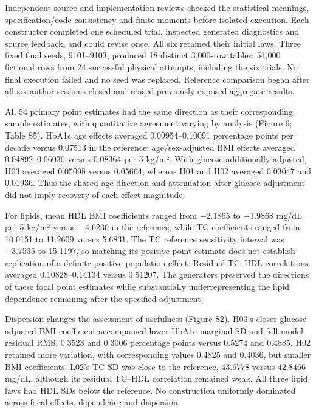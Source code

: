 \documentclass[11pt,letterpaper]{article}
\begin{document}
Independent source and implementation reviews checked the statistical meanings, specification/\allowbreak{}code consistency and finite moments before isolated execution. Each constructor completed one scheduled trial, inspected generated diagnostics and source feedback, and could revise once. All six retained their initial laws. Three fixed final seeds, 9101–\allowbreak{}9103, produced 18 distinct 3,000-row tables: 54,000 fictional rows from 24 successful physical attempts, including the six trials. No final execution failed and no seed was replaced. Reference comparison began after all six author sessions closed and reused previously exposed aggregate results.


All 54 primary point estimates had the same direction as their corresponding sample estimates, with quantitative agreement varying by analysis (Figure 6; Table S5). HbA1c age effects averaged 0.09954–\allowbreak{}0.10091 percentage points per decade versus 0.07513 in the reference; age/\allowbreak{}sex-adjusted BMI effects averaged 0.04892–\allowbreak{}0.06030 versus 0.08364 per 5 kg/\allowbreak{}m². With glucose additionally adjusted, H03 averaged 0.05098 versus 0.05664, whereas H01 and H02 averaged 0.03047 and 0.01936. Thus the shared age direction and attenuation after glucose adjustment did not imply recovery of each effect magnitude.


For lipids, mean HDL BMI coefficients ranged from −2.1865 to −1.9868 mg/\allowbreak{}dL per 5 kg/\allowbreak{}m² versus −4.6230 in the reference, while TC coefficients ranged from 10.0151 to 11.2609 versus 5.6831. The TC reference sensitivity interval was −3.7535 to 15.1197, so matching its positive point estimate does not establish replication of a definite positive population effect. Residual TC–\allowbreak{}HDL correlations averaged 0.10828–\allowbreak{}0.14134 versus 0.51207. The generators preserved the directions of these focal point estimates while substantially underrepresenting the lipid dependence remaining after the specified adjustment.


Dispersion changes the assessment of usefulness (Figure S2). H03's closer glucose-adjusted BMI coefficient accompanied lower HbA1c marginal SD and full-model residual RMS, 0.3523 and 0.3006 percentage points versus 0.5274 and 0.4885. H02 retained more variation, with corresponding values 0.4825 and 0.4036, but smaller BMI coefficients. L02's TC SD was close to the reference, 43.6778 versus 42.8466 mg/\allowbreak{}dL, although its residual TC–\allowbreak{}HDL correlation remained weak. All three lipid laws had HDL SDs below the reference. No construction uniformly dominated across focal effects, dependence and dispersion.
\end{document}
